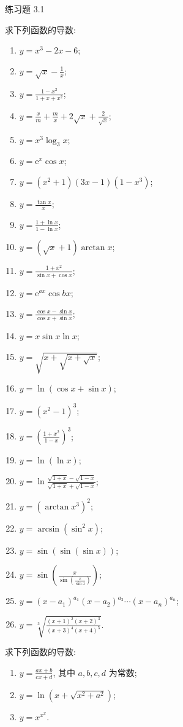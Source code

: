 \begin{exblock}{练习题 3.1}
  \item 求下列函数的导数:
  \begin{enumerate}[label=(\arabic*)]
    \item $y = x^3 - 2x - 6$;
    \item $y = \sqrt{x} - \frac{1}{x}$;
    \item $y = \frac{1-x^2}{1+x+x^2}$;
    \item $y = \frac{x}{m} + \frac{m}{x} + 2\sqrt{x} + \frac{2}{\sqrt{x}}$;
    \item $y = x^3\log_3 x$;
    \item $y = \mathrm{e}^x\cos x$;
    \item $y = (x^2+1)(3x-1)(1-x^3)$;
    \item $y = \frac{\tan x}{x}$;
    \item $y = \frac{1+\ln x}{1-\ln x}$;
    \item $y = (\sqrt{x}+1)\arctan x$;
    \item $y = \frac{1+x^2}{\sin x + \cos x}$;
    \item $y = \mathrm{e}^{ax}\cos bx$;
    \item $y = \frac{\cos x - \sin x}{\cos x + \sin x}$;
    \item $y = x\sin x\ln x$;
    \item $y = \sqrt{x + \sqrt{x + \sqrt{x}}}$;
    \item $y = \ln(\cos x + \sin x)$;
    \item $y = (x^2-1)^3$;
    \item $y = \left(\frac{1+x^2}{1-x}\right)^3$;
    \item $y = \ln(\ln x)$;
    \item $y = \ln\frac{\sqrt{1+x} - \sqrt{1-x}}{\sqrt{1+x} + \sqrt{1-x}}$;
    \item $y = (\arctan x^3)^2$;
    \item $y = \arcsin(\sin^2 x)$;
    \item $y = \sin(\sin(\sin x))$;
    \item $y = \sin\left(\frac{x}{\sin\left(\frac{x}{\sin x}\right)}\right)$;
    \item $y = (x-a_1)^{a_1}(x-a_2)^{a_2}\cdots(x-a_n)^{a_n}$;
    \item $y = \sqrt[3]{\frac{(x+1)^2(x+2)^3}{(x+3)^4(x+4)^5}}$.
  \end{enumerate}

  \item 求下列函数的导数:
  \begin{enumerate}[label=(\arabic*)]
    \item $y = \frac{ax+b}{cx+d}$, 其中 $a, b, c, d$ 为常数;
    \item $y = \ln(x + \sqrt{x^2+a^2})$;
    \item $y = x^{x^x}$.
  \end{enumerate}


\end{exblock}
